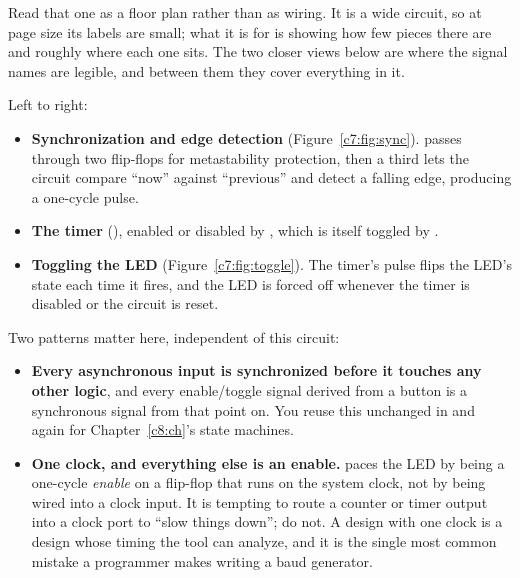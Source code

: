 
\noindent Read that one as a floor plan rather than as wiring. It is a wide circuit, so at page
size its labels are small; what it is for is showing how few pieces there are and roughly where
each one sits. The two closer views below are where the signal names are legible, and between them
they cover everything in it.

Left to right:
\begin{itemize}
  \item \textbf{Synchronization and edge detection} (Figure~\ref{c7:fig:sync}). 
    passes through two flip-flops for metastability protection, then a third lets the circuit
    compare ``now'' against ``previous'' and detect a falling edge, producing a one-cycle
     pulse.
  \item \textbf{The timer} (), enabled or disabled by , which is
    itself toggled by .
  \item \textbf{Toggling the LED} (Figure~\ref{c7:fig:toggle}). The timer's  pulse
    flips the LED's state each time it fires, and the LED is forced off whenever the timer is
    disabled or the circuit is reset.
\end{itemize}



\noindent Two patterns matter here, independent of this circuit:
\begin{itemize}
  \item \textbf{Every asynchronous input is synchronized before it touches any other logic}, and
    every enable/toggle signal derived from a button is a synchronous signal from that point on.
    You reuse this unchanged in  and again for Chapter~\ref{c8:ch}'s state machines.
  \item \textbf{One clock, and everything else is an enable.}  paces the LED by being
    a one-cycle \emph{enable} on a flip-flop that runs on the system clock, not by being wired into
    a clock input. It is tempting to route a counter or timer output into a clock port to ``slow
    things down''; do not. A design with one clock is a design whose timing the tool can analyze,
    and it is the single most common mistake a programmer makes writing a baud generator.
\end{itemize}

